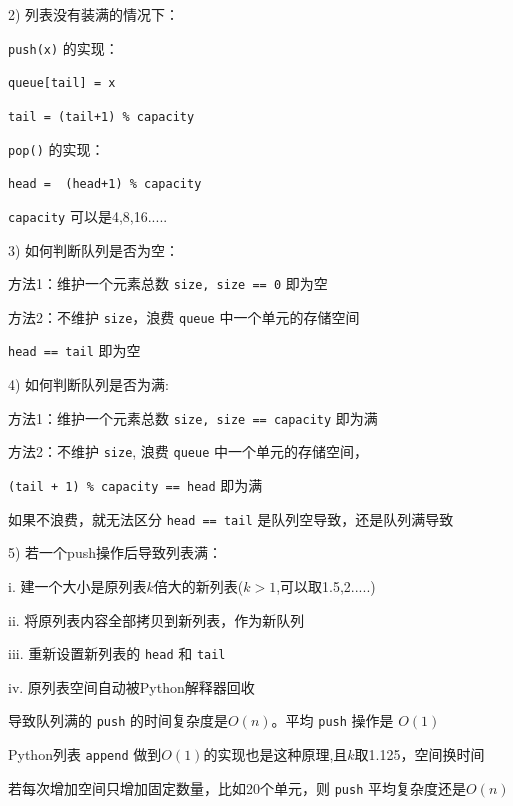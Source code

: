 \documentclass[10pt,UTF8,a4paper]{ctexart}
\begin{document}
\begin{multicols}{3}
2) 列表没有装满的情况下：

\verb|push(x)| 的实现：

	\verb|queue[tail] = x|

	\verb|tail = (tail+1) % capacity|

\verb|pop()| 的实现：

	\verb|head =  (head+1) % capacity|

\verb|capacity| 可以是4,8,16.....

3) 如何判断队列是否为空：

    方法1：维护一个元素总数 \verb|size, size == 0| 即为空

    方法2：不维护 \verb|size|，浪费 \verb|queue| 中一个单元的存储空间

                 \verb|head == tail| 即为空

4) 如何判断队列是否为满:

    方法1：维护一个元素总数 \verb|size, size == capacity| 即为满

    方法2：不维护 \verb|size|, 浪费 \verb|queue| 中一个单元的存储空间，

	    \verb|(tail + 1) % capacity == head| 即为满

                 如果不浪费，就无法区分 \verb|head == tail| 是队列空导致，还是队列满导致


5) 若一个push操作后导致列表满：

i. 建一个大小是原列表$k$倍大的新列表($k>1$,可以取1.5,2.....)

ii. 将原列表内容全部拷贝到新列表，作为新队列

iii. 重新设置新列表的 \verb|head| 和 \verb|tail|   

iv. 原列表空间自动被Python解释器回收

导致队列满的 \verb|push| 的时间复杂度是$O(n)$。平均 \verb|push| 操作是 $O(1)$

Python列表 \verb|append| 做到$O(1)$的实现也是这种原理,且$k$取1.125，空间换时间

若每次增加空间只增加固定数量，比如20个单元，则 \verb|push| 平均复杂度还是$O(n)$


\end{multicols}
\end{document}
